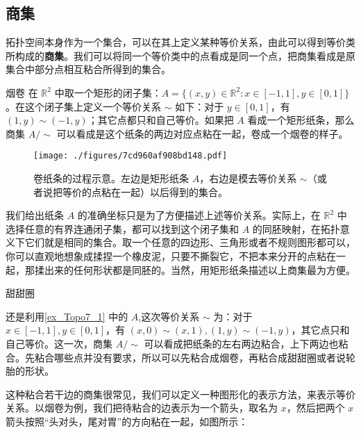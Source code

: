 

\subsection{商集}

拓扑空间本身作为一个集合，可以在其上定义某种等价关系，由此可以得到等价类所构成的\textbf{商集}。我们可以将同一个等价类中的点看成是同一个点，把商集看成是原集合中部分点相互粘合所得到的集合。

\begin{example}{烟卷}\label{ex_Topo7_1}
在 $\mathbb{R}^2$ 中取一个矩形的闭子集：$A=\{(x,y)\in\mathbb{R}^2:x\in[-1,1],y\in[0,1]\}$。在这个闭子集上定义一个等价关系 $\sim$ 如下：对于 $y\in[0,1]$，有 $(1, y)\sim(-1, y)$；其它点都只和自己等价。如果把 $A$ 看成一个矩形纸条，那么商集 $A/\sim$ 可以看成是这个纸条的两边对应点粘在一起，卷成一个烟卷的样子。

\begin{figure}[ht]
\centering
\texttt{[image: ./figures/7cd960af908bd148.pdf]}
\caption{卷纸条的过程示意。左边是矩形纸条 $A$，右边是模去等价关系 $\sim$（或者说把等价的点粘在一起）以后得到的集合。} \label{fig_Topo7_1}
\end{figure}

\end{example}



我们给出纸条 $A$ 的准确坐标只是为了方便描述上述等价关系。实际上，在 $\mathbb{R}^2$ 中选择任意的有界连通闭子集，都可以找到这个闭子集和 $A$ 的同胚映射，在拓扑意义下它们就是相同的集合。取一个任意的四边形、三角形或者不规则图形都可以，你可以直观地想象成揉捏一个橡皮泥，只要不撕裂它，不把本来分开的点粘在一起，那揉出来的任何形状都是同胚的。当然，用矩形纸条描述以上商集最为方便。

\begin{example}{甜甜圈}

还是利用\autoref{ex_Topo7_1} 中的 $A$,这次等价关系 $\sim$ 为：对于 $x\in[-1,1], y\in[0,1]$，有 $(x,0)\sim(x,1), (1, y)\sim(-1, y)$，其它点只和自己等价。这一次，商集 $A/\sim$ 可以看成把纸条的左右两边粘合，上下两边也粘合。先粘合哪些点并没有要求，所以可以先粘合成烟卷，再粘合成甜甜圈或者说轮胎的形状。

\end{example}

这种粘合若干边的商集很常见，我们可以定义一种图形化的表示方法，来表示等价关系。以烟卷为例，我们把待粘合的边表示为一个箭头，取名为 $x$，然后把两个 $x$ 箭头按照“头对头，尾对胃”的方向粘在一起，如图所示：

